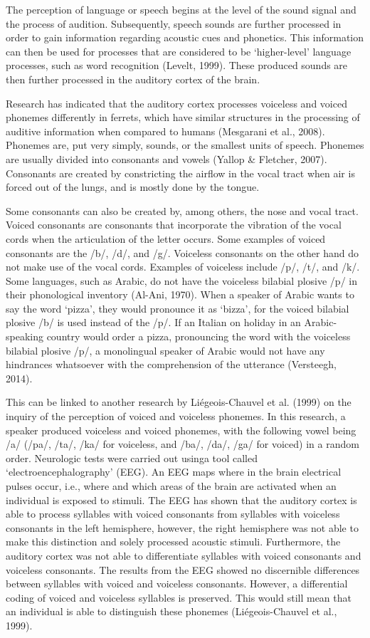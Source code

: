 The perception of language or speech begins at the level of the sound signal and the process of audition. Subsequently, speech sounds are further processed in order to gain information regarding acoustic cues and phonetics. This information can then be used for processes that are considered to be ‘higher-level’ language processes, such as word recognition (Levelt, 1999). These produced sounds are then further processed in the auditory cortex of the brain. 

Research has indicated that the auditory cortex processes voiceless and voiced phonemes differently in ferrets, which have similar structures in the processing of auditive information when compared to humans (Mesgarani et al., 2008). Phonemes are, put very simply, sounds, or the smallest units of speech. Phonemes are usually divided into consonants and vowels (Yallop \& Fletcher, 2007). Consonants are created by constricting the airflow in the vocal tract when air is forced out of the lungs, and is mostly done by the tongue. 

Some consonants can also be created by, among others, the nose and vocal tract. Voiced consonants are consonants that incorporate the vibration of the vocal cords when the articulation of the letter occurs. Some examples of voiced consonants are the /b/, /d/, and /g/. Voiceless consonants on the other hand do not make use of the vocal cords. Examples of voiceless include /p/, /t/, and /k/. Some languages, such as Arabic, do not have the voiceless bilabial plosive /p/ in their phonological inventory (Al-Ani, 1970). When a speaker of Arabic wants to say the word ‘pizza’, they would pronounce it as ‘bizza’, for the voiced bilabial plosive /b/ is used instead of the /p/. If an Italian on holiday in an Arabic-speaking country would order a pizza, pronouncing the word with the voiceless bilabial plosive /p/, a monolingual speaker of Arabic would not have any hindrances whatsoever with the comprehension of the utterance (Versteegh, 2014). 

This can be linked to another research by Liégeois-Chauvel et al. (1999) on the inquiry of the perception of voiced and voiceless phonemes. In this research, a speaker produced voiceless and voiced phonemes, with the following vowel being /a/ (/pa/, /ta/, /ka/ for voiceless, and /ba/, /da/, /ga/ for voiced) in a random order. Neurologic tests were carried out usinga tool called ‘electroencephalography’ (EEG). An EEG maps where in the brain electrical pulses occur, i.e., where and which areas of the brain are activated when an individual is exposed to stimuli. The EEG has shown that the auditory cortex is able to process syllables with voiced consonants from syllables with voiceless consonants in the left hemisphere, however, the right hemisphere was not able to make this distinction and solely processed acoustic stimuli. Furthermore, the auditory cortex was not able to differentiate syllables with voiced consonants and voiceless consonants. The results from the EEG showed no discernible differences between syllables with voiced and voiceless consonants. However, a differential coding of voiced and voiceless syllables is preserved. This would still mean that an individual is able to distinguish these phonemes (Liégeois-Chauvel et al., 1999).

